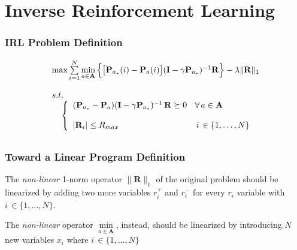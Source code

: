 \section{Inverse Reinforcement Learning}

\begin{frame}
	\frametitle{IRL Problem Definition}
	
	\Large
	
	\begin{equation*}
		\begin{array}{ll}
			\max \sum\limits_{i=1}^N \min\limits_{a \in \mathbf{A}} \Big
			\{ \big [ \mathbf{P}_{a_*}(i) - \mathbf{P}_a(i) \big ] ( \mathbf{I} - \gamma
			\mathbf{P}_{a_*})^{-1} \mathbf{R} \Big \} - \lambda \| \mathbf{R} \|_1 \\ \\
			s.t. \\ \;\;\;\;
			\left \{
				\begin{array}{ll}
					(\mathbf{P}_{a_*} - \mathbf{P}_a)(\mathbf{I} - \gamma
					\mathbf{P}_{a_*})^{-1} \, \mathbf{R} \succeq 0 \;\,\,\,\, \forall \, a \in
					\mathbf{A} \\ \\
					| \mathbf{R}_i | \leq R_{max} \;\;\;\;\;\;\;\;\;\;\;\;\;\;\;\;\;\;\;\;\;\
					\;\;\;\;\;\;\;\;\,\,\,\,\, i \, \in \{ 1, \ldots, N \}
				\end{array}
			\right.
			\vspace{0.2cm}
		\end{array}
	\end{equation*}
\end{frame}

\begin{frame}
	\frametitle{Toward a Linear Program Definition}
	
	\Large
	
	\vspace{0.4cm}
	
	The \emph{non-linear} 1-norm operator $ \| \mathbf{R} \|_1 $ of the original problem should
	be linearized by adding two more variables $ r_i^+ $ and $ r_i^- $ for every $ r_i $
	variable with $ i \, \in \{ 1, \ldots, N \} $.
	
	\vspace{0.8cm}
	
	The \emph{non-linear} operator $ \min\limits_{a \in \mathbf{A}} $, instead, should be
	linearized by introducing $ N $ new variables $ x_i $ where $ i \, \in \{ 1, \ldots, N \} $
\end{frame}

